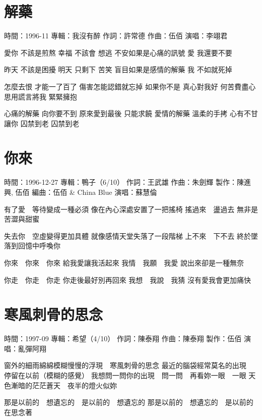 \documentclass[UTF8,a4paper,oneside,twocolumn,12pt]{ctexbook}
\newcommand{\infopair}[2]{\textbullet #1：#2}
\newcommand{\zc}[1][伍佰]{\infopair{作詞}{#1}}
\newcommand{\zq}[1][伍佰]{\infopair{作曲}{#1}}
\newcommand{\bq}[1][伍佰]{\infopair{編曲}{#1}}
\newcommand{\zj}[1]{\infopair{專輯}{#1}}
\newcommand{\zz}[1]{\infopair{製作}{#1}}
\newcommand{\sj}[1]{\infopair{時間}{#1}}
\newenvironment{info}{\begin{flushleft}\kaishu
	}
	{\end{flushleft}\normalsize\yahei\par}
\newenvironment{lyric}{
	}
{}
\begin{document}
\section{解藥}
\begin{info}
	\sj{1996-11}
	\zj{我沒有醉}
	\zc[許常德]
	\zq
	\infopair{演唱}{李翊君}
\end{info}
\begin{lyric}
	愛你 不該是煎熬 幸福 不該會 想逃
	不安如果是心痛的訊號 愛 我還要不要

	昨天 不該是困擾 明天 只剩下 苦笑
	盲目如果是感情的解藥 我 不如就死掉

	怎麼去恨 才能一了百了 傷害怎能認錯就忘掉
	如果你不是 真心對我好 何苦費盡心思用謊言將我 緊緊擁抱

	心痛的解藥 向你要不到 原來愛到最後 只能求饒
	愛情的解藥 溫柔的手拷 心有不甘讓你 囚禁到老 囚禁到老
\end{lyric}

\section{你來}
\begin{info}
	\sj{1996-12-27}
	\zj{鴨子（6/10）}
	\zc[王武雄]
	\zq[朱劍輝]
	\zz{陳進興, 伍佰}
	\bq[伍佰 \& China Blue]
	\infopair{演唱}{蘇慧倫}
\end{info}
\begin{lyric}
	有了愛　等待變成一種必須
	像在內心深處安置了一把搖椅
	搖過來　盪過去
	無非是苦澀與甜蜜

	失去你　空虛變得更加具體
	就像感情天堂失落了一段階梯
	上不來　下不去
	終於墜落到回憶中呼喚你

	你來　你來　你來
	給我愛讓我活起來
	我情　我願　我愛
	說出來卻是一種無奈

	你走　你走　你走
	你走後最好別再回來
	我想　我說　我猜
	沒有愛我會更加痛快
\end{lyric}

\section{寒風刺骨的思念}
\begin{info}
	\sj{1997-09}
	\zj{希望（4/10）}
	\zc[陳泰翔]
	\zq[陳泰翔]
	\zz{伍佰}
	\infopair{演唱}{亂彈阿翔}
\end{info}
\begin{lyric}
	窗外的細雨綿綿模糊慢慢的浮現　寒風刺骨的思念
	最近的腦袋經常莫名的出現　停留在以前（模糊的感覺）
	我想問一問你的出現　問一問　再看妳一眼　一眼
	天色漸暗的茫茫蒼天　夜半的燈火似妳

	那是以前的　想遺忘的　是以前的　想遺忘的
	那是以前的　想遺忘的　是以前的　在思念著
\end{lyric}
\end{document}
